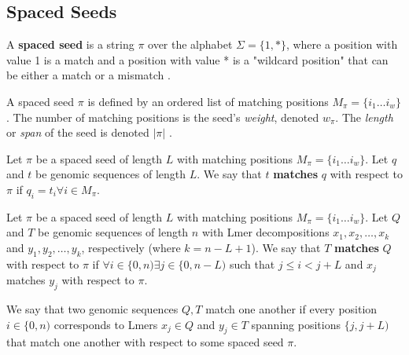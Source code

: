 \subsection{Spaced Seeds}
\begin{defn}
A \textbf{spaced seed} is a string $\pi$ over the alphabet $\Sigma =\lbrace 1,* \rbrace$, where a position with value 1 is a match and a position with value * is a "wildcard position" that can be either a match or a mismatch \cite{chao2008sequence}. \end{defn}

A spaced seed $\pi$ is defined by an ordered list of matching positions $M_{\pi} = \lbrace i_{1} \dotsc i_{w} \rbrace$. The number of matching positions is the seed's \textit{weight}, denoted $w_{\pi}$. The \textit{length} or \textit{span} of the seed is denoted $\lvert \pi \rvert$ \cite{buhler2005designing}.

\begin{defn}
Let $\pi$ be a spaced seed of length $L$ with matching positions $M_{\pi} = \lbrace i_{1} \dotsc i_{w} \rbrace$. Let $q$ and $t$ be genomic sequences of length $L$. We say that $t$ \textbf{matches} $q$ with respect to $\pi$ if $q_{i} = t_{i} \forall i \in M_{\pi}$.
\end{defn}

\begin{defn}
Let $\pi$ be a spaced seed of length $L$ with matching positions $M_{\pi} = \lbrace i_{1} \dotsc i_{w} \rbrace$. Let $Q$ and $T$ be genomic sequences of length $n$ with Lmer decompositions $x_{1},x_{2},\dotsc ,x_{k}$ and $y_{1},y_{2},\dotsc ,y_{k}$, respectively (where $k = n - L + 1$). We say that $T$ \textbf{matches} $Q$ with respect to $\pi$ if $\forall i \in \lbrace 0, n) \exists j \in \lbrace 0, n-L)$ such that $j \leq i < j+L$ and $x_{j}$ matches $y_{j}$ with respect to $\pi$.
\end{defn}

We say that two genomic sequences $Q,T$ match one another if every position $i \in \lbrace 0,n)$ corresponds to Lmers $x_{j} \in Q$ and $y_{j} \in T$ spanning positions $\lbrace j,j+L)$ that match one another with respect to some spaced seed $\pi$. 